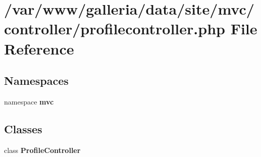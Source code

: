 \section{/var/www/galleria/data/site/mvc/controller/profilecontroller.php File Reference}
\label{profilecontroller_8php}
\subsection*{Namespaces}
\begin{CompactItemize}
\item 
namespace {\bf mvc}
\end{CompactItemize}
\subsection*{Classes}
\begin{CompactItemize}
\item 
class {\bf ProfileController}
\end{CompactItemize}
